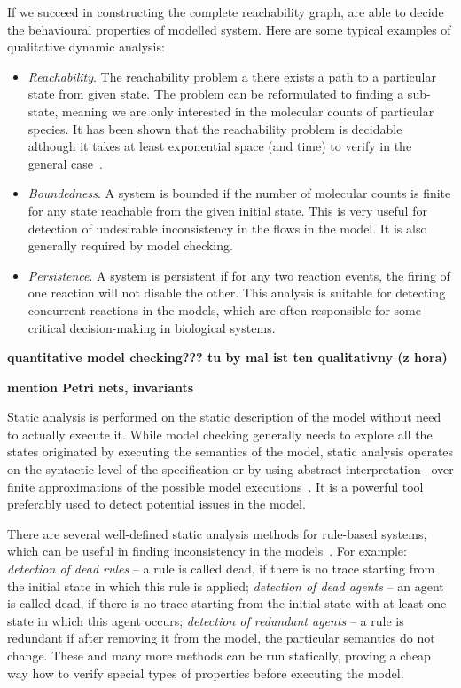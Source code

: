 \documentclass[11pt,a4paper]{report}
\begin{document}
If we succeed in constructing the complete reachability graph, are able to decide the behavioural properties of modelled system. Here are some typical examples of qualitative dynamic analysis:

\begin{itemize}
	\item \emph{Reachability}. The reachability problem a there exists a path to a particular state from given state. The problem can be reformulated to finding a sub-state, meaning we are only interested in the molecular counts of particular species. It has been shown that the reachability problem is decidable~\cite{kosaraju1982decidability} although it takes at least exponential space (and time) to verify in the general case~\cite{lipton1976reachability}.
	\item \emph{Boundedness}. A system is bounded if the number of molecular counts is finite for any state reachable from the given initial state. This is very useful for detection of undesirable inconsistency in the flows in the model. It is also generally required by model checking.
	\item \emph{Persistence}. A system is persistent if for any two reaction events, the firing of one reaction will not disable the other. This analysis is suitable for detecting concurrent reactions in the models, which are often responsible for some critical decision-making in biological systems.
\end{itemize}

\textbf{quantitative model checking??? tu by mal ist ten qualitativny (z hora)}

\textbf{mention Petri nets, invariants}

Static analysis is performed on the static description of the model without need to actually execute it. While model checking generally needs to explore all the states originated by executing the semantics of the model, static analysis operates on the syntactic level of the specification or by using abstract interpretation~\cite{cousot1977abstract} over finite approximations of the possible model executions~\cite{pauleve2012static}. It is a powerful tool preferably used to detect potential issues in the model.

There are several well-defined static analysis methods for rule-based systems, which can be useful in finding inconsistency in the models~\cite{danos2009rule}. For example: \emph{detection of dead rules} -- a rule is called dead, if there is no trace starting from the initial state in which this rule is applied; \emph{detection of dead agents} -- an agent is called dead, if there is no trace starting from the initial state with at least one state in which this agent occurs; \emph{detection of redundant agents} -- a rule is redundant if after removing it from the model, the particular semantics do not change. These and many more methods can be run statically, proving a cheap way how to verify special types of properties before executing the model.
\end{document}

